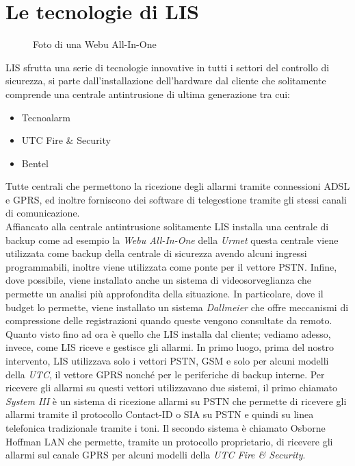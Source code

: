 \section{Le tecnologie di LIS}
\begin{figure}
	\centering
	\caption{Foto di una Webu All-In-One}\label{fig:webuall}
\end{figure}
LIS sfrutta una serie di tecnologie innovative in tutti i settori del controllo di sicurezza, si parte dall'installazione dell'hardware dal cliente che solitamente comprende una centrale antintrusione di ultima generazione tra cui:
\begin{itemize}
	\item Tecnoalarm
	\item UTC Fire \& Security
	\item Bentel
\end{itemize}
Tutte centrali che permettono la ricezione degli allarmi tramite connessioni ADSL e GPRS, ed inoltre forniscono dei software di telegestione tramite gli stessi canali di comunicazione.\\
Affiancato alla centrale antintrusione solitamente LIS installa una centrale di backup come ad esempio la \emph{Webu All-In-One} della \emph{Urmet} questa centrale viene utilizzata come backup della centrale di sicurezza avendo alcuni ingressi programmabili, inoltre viene utilizzata come ponte per il vettore PSTN. Infine, dove possibile, viene installato anche un sistema di videosorveglianza che permette un analisi più approfondita della situazione. In particolare, dove il budget lo permette, viene installato un sistema \emph{Dallmeier} che offre meccanismi di compressione delle registrazioni quando queste vengono consultate da remoto\cite{dallmeier:premote}.\\
Quanto visto fino ad ora è quello che LIS installa dal cliente; vediamo adesso, invece, come LIS riceve e gestisce gli allarmi. In primo luogo, prima del nostro intervento, LIS utilizzava solo i vettori PSTN, GSM e solo per alcuni modelli della \emph{UTC}, il vettore GPRS nonché per le periferiche di backup interne. Per ricevere gli allarmi su questi vettori utilizzavano due sistemi, il primo chiamato \emph{System III} è un sistema di ricezione allarmi su PSTN che permette di ricevere gli allarmi tramite il protocollo Contact-ID o SIA su PSTN e quindi su linea telefonica tradizionale tramite i toni. Il secondo sistema è chiamato Osborne Hoffman LAN che permette, tramite un protocollo proprietario, di ricevere gli allarmi sul canale GPRS per alcuni modelli della \emph{UTC Fire \& Security}.\\
